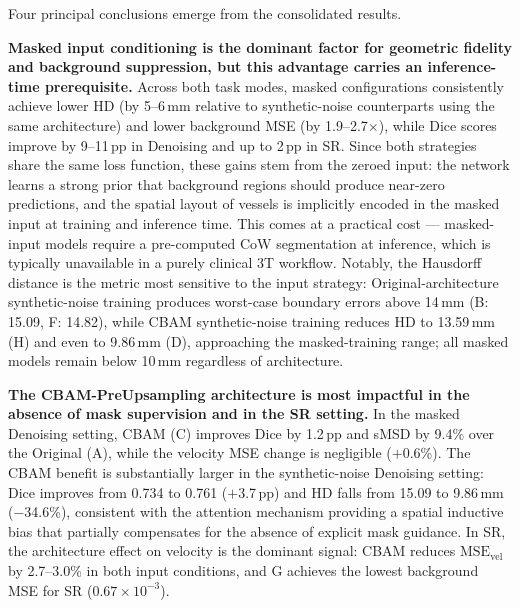 \documentclass[11pt]{article}
\begin{document}
Four principal conclusions emerge from the consolidated results.

\textbf{Masked input conditioning is the dominant factor for geometric fidelity and background
suppression, but this advantage carries an inference-time prerequisite.}  Across both task
modes, masked configurations consistently achieve lower HD (by 5--6\,mm relative to
synthetic-noise counterparts using the same architecture) and lower background MSE (by
1.9--2.7$\times$), while Dice scores improve by 9--11\,pp in Denoising and up to 2\,pp in SR.
Since both strategies share the same loss function, these gains stem from the zeroed input: the
network learns a strong prior that background regions should produce near-zero predictions, and
the spatial layout of vessels is implicitly encoded in the masked input at training and inference
time.  This comes at a practical cost --- masked-input models require a pre-computed CoW
segmentation at inference, which is typically unavailable in a purely clinical 3T workflow.
Notably, the Hausdorff distance is the metric most sensitive to the input strategy:
Original-architecture synthetic-noise training produces worst-case boundary errors above
14\,mm (B: 15.09, F: 14.82), while CBAM synthetic-noise training reduces HD to 13.59\,mm (H)
and even to 9.86\,mm (D), approaching the masked-training range; all masked models remain below
10\,mm regardless of architecture.

\textbf{The CBAM-PreUpsampling architecture is most impactful in the absence of mask supervision
and in the SR setting.}  In the masked Denoising setting, CBAM (C) improves Dice by 1.2\,pp and
sMSD by 9.4\% over the Original (A), while the velocity MSE change is negligible ($+$0.6\%).  The
CBAM benefit is substantially larger in the synthetic-noise Denoising setting: Dice improves from
0.734 to 0.761 ($+$3.7\,pp) and HD falls from 15.09 to 9.86\,mm ($-$34.6\%), consistent with
the attention mechanism providing a spatial inductive bias that partially compensates for the
absence of explicit mask guidance.  In SR, the architecture effect on velocity is the dominant
signal: CBAM reduces $\text{MSE}_\text{vel}$ by 2.7--3.0\% in both input conditions, and G
achieves the lowest background MSE for SR ($0.67{\times}10^{-3}$).
\end{document}
